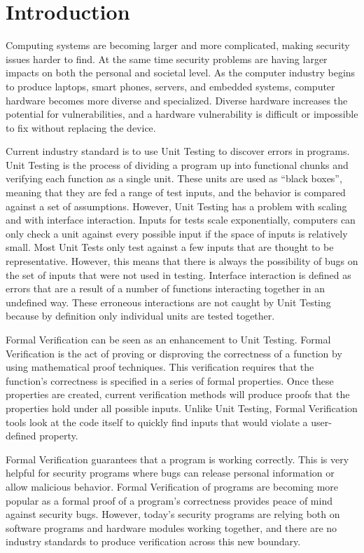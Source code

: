 \documentclass[../report.tex]{subfiles}
\begin{document}
\onehalfspacing

\section{Introduction}

Computing systems are becoming larger and more complicated, making security
issues harder to find.
At the same time security problems are having larger impacts on both the personal and societal level.
As the computer industry begins to produce laptops, smart phones, servers, and embedded systems, computer
hardware becomes more diverse and specialized. Diverse hardware increases the
potential for vulnerabilities, and a hardware vulnerability is difficult or
impossible to fix without replacing the device. 

Current industry standard is to use Unit Testing to discover errors in programs. 
Unit Testing is the process of dividing a program up into functional chunks and
verifying each function as a single unit. 
These units are used as ``black boxes'', meaning that they are fed a range
of test inputs, and the behavior is compared against a set of assumptions.
However, Unit Testing has a problem with scaling and with interface interaction.
Inputs for tests scale exponentially, computers can only check a unit against
every possible input if the space of inputs is relatively small. 
Most Unit Tests only test against a few inputs that are thought to be
representative. 
However, this means that there is always the possibility of bugs
on the set of inputs that were not used in testing.
Interface interaction is defined as errors that are a result of a number of
functions interacting together in an undefined way.
These erroneous interactions are not caught by Unit Testing because by
definition only individual units are tested together. 

Formal Verification can be seen as an enhancement to Unit Testing. 
Formal Verification is the act of proving or disproving the correctness of a
function by using mathematical proof techniques. 
This verification requires that the function's correctness is specified in a
series of formal properties.
Once these properties are created, current verification methods 
will produce proofs that the properties hold under all possible inputs.
Unlike Unit Testing, Formal Verification tools look at the code itself to quickly find inputs that would violate a user-defined property. 

Formal Verification guarantees that a program is working correctly. 
This is very helpful for security programs where bugs can release personal information or allow malicious behavior.
Formal Verification of programs are becoming more popular as a formal proof of
a program's correctness provides peace of mind against security bugs.
However, today's security programs are relying both on software programs and
hardware modules working together, and there are no industry standards to
produce verification across this new boundary.
\end{document}
